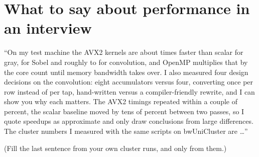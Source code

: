 \section{What to say about performance in an interview}

\begin{sound}
``On my test machine the AVX2 kernels are about \spGrayAvx{} times faster than scalar for gray, \spSobelAvx{} for Sobel and roughly \spConvNineAvx{} to \spConvThreeAvx{} for convolution, and OpenMP multiplies that by the core count until memory bandwidth takes over. I also measured four design decisions on the convolution: eight accumulators versus four, converting once per row instead of per tap, hand-written versus a compiler-friendly rewrite, and I can show you why each matters. The AVX2 timings repeated within a couple of percent, the scalar baseline moved by tens of percent between two passes, so I quote speedups as approximate and only draw conclusions from large differences. The cluster numbers I measured with the same scripts on bwUniCluster are \dots''
\end{sound}
(Fill the last sentence from your own cluster runs, and only from them.)
